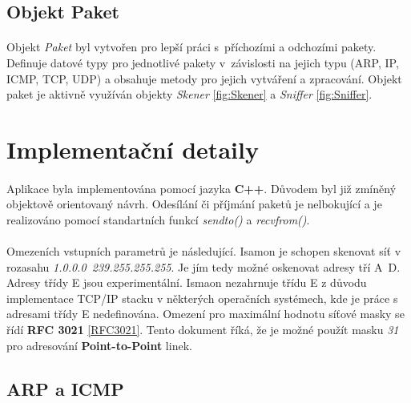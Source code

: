 \documentclass[a4paper,11pt,onecolumn,notitlepage]{article}
\begin{document}
\subsection{Objekt Paket}
\paragraph{} Objekt \emph{Paket} byl vytvořen pro lepší práci s~příchozími a odchozími pakety. Definuje datové typy pro jednotlivé pakety v~závislosti na jejich typu (ARP, IP, ICMP, TCP, UDP) a obsahuje metody pro jejich vytváření a zpracování. Objekt paket je aktivně využíván objekty \emph{Skener} \ref{fig:Skener} a \emph{Sniffer} \ref{fig:Sniffer}.

\newpage
\section{Implementační detaily}
\paragraph{} Aplikace byla implementována pomocí jazyka \textbf{C++}. Důvodem byl již zmíněný objektově orientovaný návrh. Odesílání či příjmání paketů je nelbokující a je realizováno pomocí standartních funkcí \emph{sendto()} a \emph{recvfrom()}.

\paragraph{} Omezeních vstupních parametrů je následující. Isamon je schopen skenovat síť v rozasahu \emph{1.0.0.0~239.255.255.255}. Je jím tedy možné oskenovat adresy tří A~D. Adresy třídy E jsou experimentální. Ismaon nezahrnuje třídu E z důvodu implementace TCP/IP stacku v některých operačních systémech, kde je práce s adresami třídy E nedefinována. Omezení pro maximální hodnotu síťové masky se řídí \textbf{RFC 3021} \ref{RFC3021}. Tento dokument říká, že je možné použít masku \emph{31} pro adresování \textbf{Point-to-Point} linek.
\subsection{ARP a ICMP}
\end{document}
